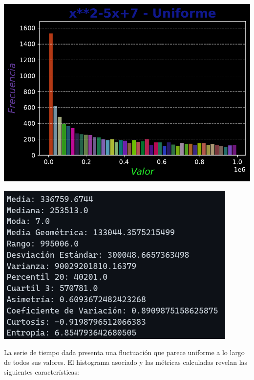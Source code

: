 \documentclass[11pt]{article} %
\begin{document}
		\begin{multicols}{2}
			\begin{minipage}{\linewidth}
				\centering
				\includegraphics[width=1\linewidth]{../transformaciones/cuad_uniforme2.pdf}
				\label{fig:cuadUnifHist}
			\end{minipage}
			\vfill\columnbreak
			\begin{minipage}{\linewidth}
				\centering
				\includegraphics[width=1\linewidth]{../transformaciones/cuad_uniforme3.png}
				\label{cuadUnifMet}
			\end{minipage}
		\end{multicols}
	
	La serie de tiempo dada presenta una fluctuación que parece uniforme a lo largo de todos sus valores. El histograma asociado y las métricas calculadas revelan las siguientes características:
	
\end{document}
